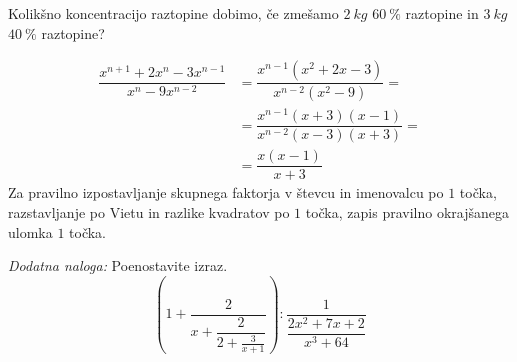 \documentclass[addpoints]{exam}
\begin{document}
\begin{questions}

        \newpage

        \question[4]
        Kolikšno koncentracijo raztopine dobimo, če zmešamo $2~kg$ $60~\%$ raztopine in $3~kg$ $40~\%$ raztopine?

        \begin{solution}[10cm]
            \begin{align*}
                \dfrac{x^{n+1}+2x^n-3x^{n-1}}{x^n-9x^{n-2}} &= \dfrac{x^{n-1}(x^{2}+2x-3)}{x^{n-2}(x^2-9)}= \\
                                                            &= \dfrac{x^{n-1}(x+3)(x-1)}{x^{n-2}(x-3)(x+3)}= \\
                                                            &= \dfrac{x(x-1)}{x+3}
            \end{align*}
            Za pravilno izpostavljanje skupnega faktorja v števcu in imenovalcu po $1$ točka, razstavljanje po Vietu in razlike kvadratov po $1$ točka, zapis pravilno okrajšanega ulomka $1$ točka.
        \end{solution}





    \bonusquestion[4]
    \textit{Dodatna naloga:} Poenostavite izraz. $$\left(1+\dfrac{2}{x+\dfrac{2}{2+\frac{3}{x+1}}}\right):\dfrac{1}{\dfrac{2x^2+7x+2}{x^3+64}}$$


\end{questions}
\end{document}
